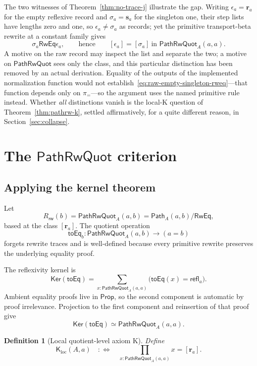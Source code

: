 \documentclass[10pt,reqno]{amsart}
\newtheorem{definition}[theorem]{Definition}
\newcommand{\Eqv}{\simeq}
\newcommand{\PathTy}{\mathsf{Path}}
\newcommand{\refl}{\mathsf{refl}}
\newcommand{\Ker}{\mathsf{Ker}}
\newcommand{\PRW}{\mathsf{PathRwQuot}}
\newcommand{\LocalK}{\mathsf K_{\mathrm{loc}}}
\begin{document}
The two witnesses of Theorem~\ref{thm:no-trace-j} illustrate the gap.  Writing
\(\epsilon_a=\mathbf r_a\) for the empty reflexive record and
\(\sigma_a=\mathbf s_a\) for the singleton one, their step lists have lengths
zero and one, so \(\epsilon_a\ne\sigma_a\) as records; yet the primitive
transport-beta rewrite at a constant family gives
\[
 \sigma_a\mathrel{\mathsf{RwEq}}\epsilon_a,
 \qquad\text{hence}\qquad
 [\epsilon_a]=[\sigma_a]\ \text{in }\PRW_A(a,a).
\tag{9.11}\label{eq:raw-empty-singleton-rweq}
\]
A motive on the raw record may inspect the list and separate the two; a motive on
\(\PRW\) sees only the class, and this particular distinction has been removed by
an actual derivation.  Equality of the outputs of the implemented normalization
function would not establish~\eqref{eq:raw-empty-singleton-rweq}---that function
depends only on \(\pi_{=}\)---so the argument uses the named primitive rule
instead.  Whether \emph{all} distinctions vanish is the local-K question of
Theorem~\ref{thm:pathrw-k}, settled affirmatively, for a quite different reason,
in Section~\ref{sec:collapse}.

\section{\texorpdfstring{The \(\mathsf{PathRwQuot}\) criterion}{The PathRwQuot criterion}}
\label{sec:pathrwquot-criterion}

\subsection{Applying the kernel theorem}

Let
\[
 R_{\mathsf{rw}}(b)=\PRW_A(a,b)
 =\PathTy_A(a,b)/\mathsf{RwEq},
\tag{10.1}\label{eq:pathrw-row}
\]
based at the class \([\mathbf r_a]\).  The quotient operation
\[
 \mathsf{toEq}_b:\PRW_A(a,b)\longrightarrow(a=b)
\tag{10.2}\label{eq:pathrw-toeq}
\]
forgets rewrite traces and is well-defined because every primitive rewrite
preserves the underlying equality proof.

The reflexivity kernel is
\[
 \Ker(\mathsf{toEq})
 =
 \sum_{x:\PRW_A(a,a)}
       \bigl(\mathsf{toEq}(x)=\refl_a\bigr).
\tag{10.3}\label{eq:pathrw-kernel}
\]
Ambient equality proofs live in \(\mathsf{Prop}\), so the second component is
automatic by proof irrelevance.  Projection to the first component and
reinsertion of that proof give
\[
              \Ker(\mathsf{toEq})\Eqv\PRW_A(a,a).
\tag{10.4}\label{eq:pathrw-kernel-loop}
\]

\begin{definition}[Local quotient-level axiom K]
\label{def:local-k}
Define
\[
 \LocalK(A,a)
 \quad:\!\!\Longleftrightarrow\quad
 \prod_{x:\PRW_A(a,a)}x=[\mathbf r_a].
\tag{10.5}\label{eq:local-k}
\]
\end{definition}
\end{document}
